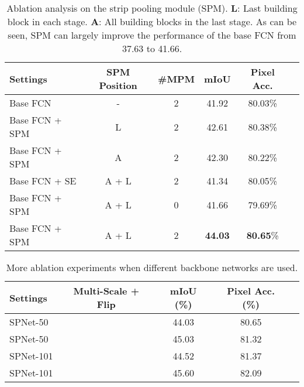 \documentclass[final]{cvpr}
\newcommand{\cmark}{\ding{51}}\newcommand{\xmark}{\ding{55}}
\begin{document}
\begin{table}[t]
  \centering
  \small
  \setlength\tabcolsep{1mm}
  \renewcommand\arraystretch{1.0}
  \begin{tabular}{lccccc} \toprule[0.7pt]
    Settings             & SPM Position & \#MPM & mIoU & Pixel Acc. \\ \midrule[0.5pt]\midrule[0.5pt]
Base FCN & - & 2 & 41.92 & 80.03\% \\
    Base FCN + SPM & L & 2 & 42.61 & 80.38\% \\ Base FCN + SPM & A & 2 & 42.30 & 80.22\% \\ \midrule[0.5pt]\midrule[0.5pt]
    Base FCN + SE \cite{hu2018squeeze}  & A + L & 2 & 41.34 & 80.05\% \\
    Base FCN + SPM & A + L & 0 & 41.66 & 79.69\% \\
    Base FCN + SPM & A + L & 2 & \textbf{44.03} & \textbf{80.65}\% \\ \bottomrule[0.7pt]
  \end{tabular}
  \vspace{0pt}
  \caption{Ablation analysis on the strip pooling module (SPM). \textbf{L}: Last building block in each stage. \textbf{A}: All building blocks in the last stage. As can be seen, SPM can largely improve the performance of the base FCN from 37.63 to 41.66.}
  \label{tab:sp_block}
\end{table}






\begin{table}[t]
  \centering
  \small
  \setlength\tabcolsep{1.8mm}
  \renewcommand\arraystretch{1.0}
  \begin{tabular}{lcccc} \toprule[0.7pt]
    Settings & Multi-Scale + Flip & mIoU (\%) & Pixel Acc. (\%) \\ \midrule[0.5pt]\midrule[0.5pt]
SPNet-50  &   & 44.03 & 80.65 \\
    SPNet-50 & \cmark & 45.03 & 81.32 \\ \midrule[0.5pt]\midrule[0.5pt]
    SPNet-101 &    & 44.52 & 81.37 \\
    SPNet-101 & \cmark & 45.60 & 82.09 \\
\bottomrule[0.7pt]
  \end{tabular}
  \vspace{0pt}
  \caption{More ablation experiments when different 
  backbone networks are used.}
  \label{tab:aux_res}
\end{table}
\end{document}
